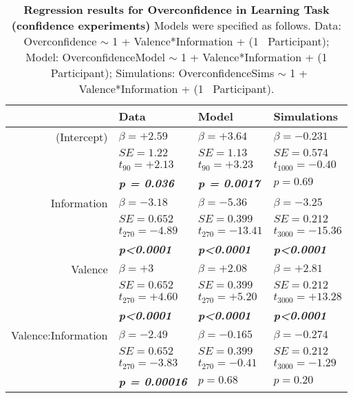 % 
% 
\begin{table}
\centering \footnotesize
\begin{tabular}{r|lll}
\hline \hline
& \textbf{Data}& \textbf{Model}& \textbf{Simulations} \\
\hline
\hline (Intercept)&$\beta=+2.59$&$\beta=+3.64$&$\beta=-0.231$\\
&$SE=1.22$&$SE=1.13$&$SE=0.574$\\
&$t_{90}=+2.13$&$t_{90}=+3.23$&$t_{1000}=-0.40$\\
&\textbf{\textit{p = 0.036}}&\textbf{\textit{p = 0.0017}}&$p=0.69$\\
\hline Information&$\beta=-3.18$&$\beta=-5.36$&$\beta=-3.25$\\
&$SE=0.652$&$SE=0.399$&$SE=0.212$\\
&$t_{270}=-4.89$&$t_{270}=-13.41$&$t_{3000}=-15.36$\\
&\textbf{\textit{p\textless0.0001}}&\textbf{\textit{p\textless0.0001}}&\textbf{\textit{p\textless0.0001}}\\
\hline Valence&$\beta=+3$&$\beta=+2.08$&$\beta=+2.81$\\
&$SE=0.652$&$SE=0.399$&$SE=0.212$\\
&$t_{270}=+4.60$&$t_{270}=+5.20$&$t_{3000}=+13.28$\\
&\textbf{\textit{p\textless0.0001}}&\textbf{\textit{p\textless0.0001}}&\textbf{\textit{p\textless0.0001}}\\
\hline Valence:Information&$\beta=-2.49$&$\beta=-0.165$&$\beta=-0.274$\\
&$SE=0.652$&$SE=0.399$&$SE=0.212$\\
&$t_{270}=-3.83$&$t_{270}=-0.41$&$t_{3000}=-1.29$\\
&\textbf{\textit{p = 0.00016}}&$p=0.68$&$p=0.20$\\
\hline \hline
\end{tabular}
\caption{\textbf{Regression results for Overconfidence in Learning Task (confidence experiments)} Models were specified as follows. Data: Overconfidence $\sim$ 1 + Valence*Information + (1 \textbar \ Participant); Model: OverconfidenceModel $\sim$ 1 + Valence*Information + (1 \textbar \ Participant); Simulations: OverconfidenceSims $\sim$ 1 + Valence*Information + (1 \textbar \ Participant).}
\label{tab:regOverconfidence_allexp}
\end{table}
